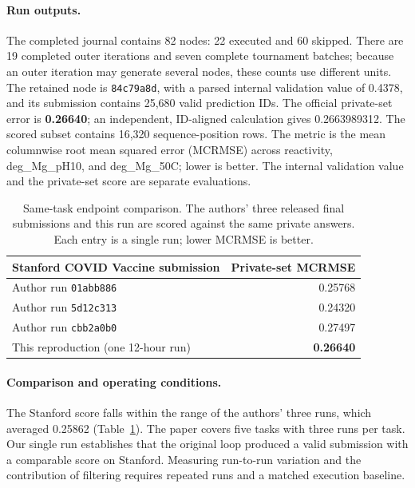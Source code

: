 \paragraph{Run outputs.}
The completed journal contains 82 nodes: 22 executed and 60 skipped. There are 19 completed outer iterations and seven complete tournament batches; because an outer iteration may generate several nodes, these counts use different units. The retained node is \texttt{84c79a8d}, with a parsed internal validation value of 0.4378, and its submission contains 25,680 valid prediction IDs. The official private-set error is \textbf{0.26640}; an independent, ID-aligned calculation gives 0.2663989312. The scored subset contains 16,320 sequence-position rows. The metric is the mean columnwise root mean squared error (MCRMSE) across reactivity, deg\_Mg\_pH10, and deg\_Mg\_50C; lower is better. The internal validation value and the private-set score are separate evaluations.

\begin{table}[htbp]
  \centering
  \caption{Same-task endpoint comparison. The authors' three released final submissions and this run are scored against the same private answers. Each entry is a single run; lower MCRMSE is better.}
  \label{tab:online-score}
  \begin{tabular}{lr}
    \toprule
    Stanford COVID Vaccine submission & Private-set MCRMSE \\
    \midrule
    Author run \texttt{01abb886} & 0.25768 \\
    Author run \texttt{5d12c313} & 0.24320 \\
    Author run \texttt{cbb2a0b0} & 0.27497 \\
    \midrule
    This reproduction (one 12-hour run) & \textbf{0.26640} \\
    \bottomrule
  \end{tabular}
\end{table}

\paragraph{Comparison and operating conditions.}
The Stanford score falls within the range of the authors' three runs, which averaged 0.25862 (Table~\ref{tab:online-score}). The paper covers five tasks with three runs per task. Our single run establishes that the original loop produced a valid submission with a comparable score on Stanford. Measuring run-to-run variation and the contribution of filtering requires repeated runs and a matched execution baseline.

